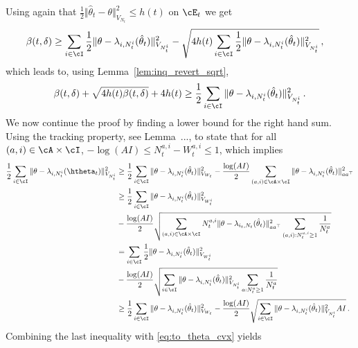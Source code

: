 Using again that $\frac{1}{2}\Vert \hat{\theta}_t -\theta \Vert_{V_{N_t}}^2 \leq h(t)$ on $\cE_t$ we get
\begin{align*}
\beta(t,\delta) &\geq\sum_{i\in\cI}\frac{1}{2} \Vert \theta - \lambda_{i,N_t^i}(\hat{\theta}_t) \Vert_{V_{N_t^i}}^2 - \sqrt{4 h(t) \sum_{i\in\cI}\frac{1}{2}\Vert \theta - \lambda_{i,N_t^i}(\hat{\theta}_t) \Vert_{V_{N_t^i}}^2}\,,
\end{align*}
which leads to, using Lemma~\ref{lem:inq_revert_sqrt},
\begin{equation}
\label{eq:to_theta_cvx}
\beta(t,\delta) + \sqrt{4 h(t) \beta(t,\delta)} +4h(t) \geq \frac{1}{2}\sum_{i\in\cI}  \Vert \theta - \lambda_{i,N_t^i}(\hat{\theta}_t) \Vert_{V_{N_t^i}}^2 \,.
\end{equation}
We now continue the proof by finding a lower bound for the right hand sum. Using the tracking property, see Lemma~..., to state that for all $(a,i)\in\cA\times\cI$, $- \log(AI) \leq N_t^{a,i} - W_t^{a,i}\leq 1$, which implies
\begin{align*}
    \frac{1}{2}\sum_{i\in\cI} \Vert \theta - \lambda_{i,N_t^i}(\htheta_t) \Vert_{V_{N_t^i}}^2
    &\geq\frac{1}{2}\sum_{i\in\cI} \Vert \theta - \lambda_{i,N_t^i}(\hat{\theta}_t) \Vert_{V_{W_t}}^2- \frac{\log(AI)}{2} \sum_{(a,i)\in\cA\times\cI} \Vert \theta - \lambda_{i,N_t^i}(\hat{\theta}_t) \Vert_{a a^\top}^2\\
    &\geq\frac{1}{2}\sum_{i\in\cI} \Vert \theta - \lambda_{i,N_t^i}(\hat{\theta}_t) \Vert_{V_{W_t^i}}^2\\
    &- \frac{\log(AI)}{2} \sqrt{\sum_{(a,i)\in\cA\times\cI} N_t^{a,i}\Vert \theta - \lambda_{i_t,N_t}(\hat{\theta}_t) \Vert_{a a^\top}^2\sum_{(a,i):N_t^{a,i}\geq1} \frac{1}{N_t^a}}\\
    &= \sum_{i\in\cI}\frac{1}{2} \Vert \theta - \lambda_{i,N_t^i}(\hat{\theta}_t) \Vert_{V_{W_t^i}}^2\\
 	&- \frac{\log(AI)}{2}
 	\sqrt{\sum_{i\in\cI}\Vert \theta -
 	\lambda_{i,N_t^i}(\hat{\theta}_t)
 	\Vert_{V_{N_t^i}}^2\sum_{a:N_t^a\geq1}
 	\frac{1}{N_t^a}}\\
    &\geq\frac{1}{2}\sum_{i\in\cI} \Vert \theta - \lambda_{i,N_t^i}(\hat{\theta}_t) \Vert_{V_{W_t}}^2
	-\frac{\log(AI)}{2} \sqrt{ \sum_{i\in\cI} \Vert \theta - \lambda_{i,N_t^i}(\hat{\theta}_t) \Vert_{V_{N_t^i}}^2  AI}\,.
\end{align*}
Combining the last inequality with \eqref{eq:to_theta_cvx} yields
